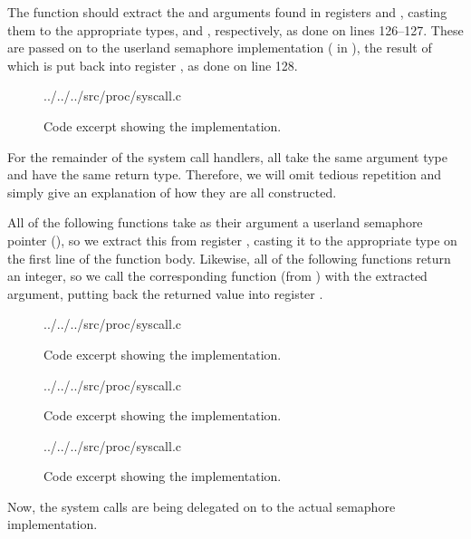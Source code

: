 The  function should extract the 
and  arguments found in registers  and , casting
them to the appropriate types,  and ,
respectively, as done on lines 126--127. These are passed on to the userland
semaphore implementation ( in
), the result of which is put back into register
, as done on line 128.
\begin{figure}[H]
    
    {../../../src/proc/syscall.c}
    \label{code:handle_syscall_sem_open}
    \caption{Code excerpt showing the 
    implementation.}
\end{figure}
For the remainder of the system call handlers, all take the same argument type
and have the same return type. Therefore, we will omit tedious repetition and
simply give an explanation of how they are all constructed.

All of the following functions take as their argument a userland semaphore
pointer (), so we extract this from register ,
casting it to the appropriate type on the first line of the function body.
Likewise, all of the following functions return an integer, so we call the
corresponding function (from ) with the extracted
argument, putting back the returned value into register .
\begin{figure}[H]
    
    {../../../src/proc/syscall.c}
    \label{code:handle_syscall_sem_procure}
    \caption{Code excerpt showing the 
    implementation.}
\end{figure}
\begin{figure}[H]
    
    {../../../src/proc/syscall.c}
    \label{code:handle_syscall_sem_vacate}
    \caption{Code excerpt showing the 
    implementation.}
\end{figure}
\begin{figure}[H]
    
    {../../../src/proc/syscall.c}
    \label{code:handle_syscall_sem_destroy}
    \caption{Code excerpt showing the 
    implementation.}
\end{figure}
Now, the system calls are being delegated on to the actual semaphore
implementation.

